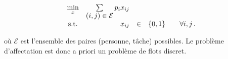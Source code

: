 	\begin{equation*}
	\begin{array}{c@{\quad} r c l@{\qquad} l}
		\min\limits_{x} & \sum\limits_{{\displaystyle (i,j) \in \mathcal{E}}} p_i x_{ij} &&&\\
		\textnormal{s.t.} & x_{ij} & \in & \{0, 1\} & \forall i,j\,.
	\end{array}
	\end{equation*}

	où $\mathcal{E}$ est l'ensemble
	des paires (personne, tâche) possibles.
	Le problème d'affectation est donc a priori
	un problème de flots discret.
